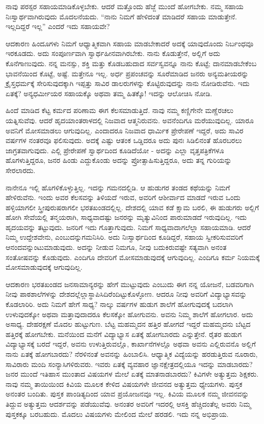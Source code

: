 ನಾವು ಪರಸ್ಪರ ಸಹಾಯಮಾಡಿಕೊಳ್ಳಬೇಕು. ಆದರೆ ಮತ್ತೊಂದು ಹೆಜ್ಜೆ ಮುಂದೆ ಹೋಗಬೇಕು. ನಮ್ಮ ಸಹಾಯ ನಿಃಸ್ವಾರ್ಥವಾಗಿರುವುದು ಮೊದಲನೆಯದು. “ನಾನು ನಿಮಗೆ ಹೇಳಿದಂತೆ ಮಾಡಿದರೆ ಸಹಾಯ ಮಾಡುತ್ತೇನೆ. ಇಲ್ಲದಿದ್ದರೆ ಇಲ್ಲ” ಎಂದರೆ ಇದು ಸಹಾಯವೇ?

ಆದಕಾರಣ ಹಿಂದೂಗಳು ನಿಮಗೆ ಆಧ್ಯಾತ್ಮಿಕವಾಗಿ ಸಹಾಯ ಮಾಡಬೇಕಾದರೆ ಅದಕ್ಕೆ ಯಾವುದೊಂದು ನಿರ್ಬಂಧವೂ ಇರಕೂಡದು. ಅದು ಸಂಪೂರ್ಣವಾಗಿ ಸ್ವಾರ್ಥಹೀನವಾಗಿರಬೇಕು. ನಾನು ಕೊಡುತ್ತೇನೆ, ಅಲ್ಲಿಗೆ ಅದು ಕೊನೆಗಾಣುವುದು. ನನ್ನ ಮನಸ್ಸು, ಶಕ್ತಿ ಮತ್ತು ಕೊಡಬಹುದಾದ ಸರ್ವಸ್ವವನ್ನೂ ನಾನು ಕೊಟ್ಟೆ; ದಾನಮಾಡಬೇಕೆಂಬ ಭಾವನೆಯಿಂದ ಕೊಟ್ಟೆ, ಅಷ್ಟೆ. ಮತ್ತೇನೂ ಇಲ್ಲ. ಅರ್ಧ ಪ್ರಪಂಚವನ್ನು ಸೂರೆಮಾಡಿದ ಜನರು ಅನ್ಯಮತೀಯರನ್ನು ಕ್ರೈಸ್ತಧರ್ಮಕ್ಕೆ ಸೇರಿಸುವುದಕ್ಕಾಗಿ ಇಪ್ಪತ್ತು ಸಾವಿರ ಡಾಲರುಗಳನ್ನು ಕೊಟ್ಟಿರುವುದನ್ನು ನಾನು ನೋಡಿರುವೆನು. ಇದು ಏತಕ್ಕೆ? ಅನ್ಯಧರ್ಮೀಯರ ಸಹಾಯಕ್ಕೊ ಅಥವಾ ತಮ್ಮ ಹಿತಕ್ಕೊ! ಇದನ್ನು ಆಲೋಚಿಸಿ ನೋಡಿ.

ಹಿಂದೆ ಮಾಡಿದ ಕೆಟ್ಟ ಕರ್ಮದ ಪರಿಣಾಮ ಈಗ ಕೆಲಸಮಾಡುತ್ತಿದೆ. ನಾವು ನಮ್ಮ ಕಣ್ಣಿಗೇನೇ ಮಣ್ಣೆರಚಲು ಯತ್ನಿಸುವೆವು. ಆದರೆ ಹೃದಯಾಂತರಾಳದಲ್ಲಿ ನಿಜವಾದ ಆತ್ಮನಿರುವನು. ಅವನೆಂದಿಗೂ ಮರೆಯುವುದಿಲ್ಲ. ಯಾರೂ ಅವನಿಗೆ ಮೋಸಮಾಡಲು ಆಗುವುದಿಲ್ಲ. ಎಂದಾದರೂ ನಿಜವಾದ ಧಾರ್ಮಿಕ ಪ್ರೇರೇಪಣೆ ಇದ್ದರೆ, ಅದು ಸಾವಿರ ವರ್ಷಗಳ ನಂತರವೂ ಫಲಿಸುವುದು. ಅದಕ್ಕೆ ಎಷ್ಟು ಆತಂಕ ಒಡ್ಡಿದರೂ ಅದು ಪುನಃ ಸಿಡಿಲಿನಂತೆ ಹೊರಬರಲು ಜಾಗ್ರತವಾಗುವುದು. ಎಲ್ಲಿ ಪ್ರೇರೇಪಣೆ ಸ್ವಾರ್ಥದಿಂದ ಕೂಡಿದೆಯೋ - ಅದನ್ನು ಎಲ್ಲಾ ವೃತ್ತಪತ್ರಿಕೆಗಳೂ ಹೊಗಳುತ್ತಿದ್ದರೂ, ಜನರ ಹಿಂಡು ಎದ್ದುಕೊಂಡು ಅದನ್ನು ಪ್ರೋತ್ಸಾಹಿಸುತ್ತಿದ್ದರೂ, ಅದು ತನ್ನ ಗುರಿಯನ್ನು ಸೇರಲಾರದು.

ನಾನೇನೂ ಇಲ್ಲಿ ಹೊಗಳಿಕೊಳ್ಳುತ್ತಿಲ್ಲ. ಇದನ್ನು ಗಮನದಲ್ಲಿಡಿ. ಆ ಹುಡುಗರ ತಂಡದ ಕಥೆಯನ್ನು ನಿಮಗೆ ಹೇಳಿರುವೆನು. ಇಂದು ಅವರ ಕೆಲಸವನ್ನು ತಿಳಿಯದೆ ಇರುವ, ಅವರಿಗೆ ಆಶೀರ್ವಾದ ಮಾಡದೆ ಇರುವ ಒಂದು ಹಳ್ಳಿಯಾಗಲೀ ಸ್ತ್ರೀಪುರುಷರಾಗಲೀ ಭರತಖಂಡದಲ್ಲಿಲ್ಲ. ದೇಶದಲ್ಲಿ ಯಾವ ಕಡೆ ಕ್ಷಾಮ ಬರಲಿ, ಈ ಹುಡುಗರು ಅಲ್ಲಿಗೆ ಹೋಗಿ ಸೇವೆಯಲ್ಲಿ ತನ್ಮಯರಾಗಿ, ಸಾಧ್ಯವಾದಷ್ಟು ಜನರನ್ನು ಮೃತ್ಯುವಿನಿಂದ ಪಾರುಮಾಡದೆ ಇರುವುದಿಲ್ಲ. ಇದು ಹೃದಯವನ್ನು ತಟ್ಟುವುದು. ಜನರಿಗೆ ಇದು ಗೊತ್ತಾಗುವುದು. ನಿಮಗೆ ಸಾಧ್ಯವಾದಾಗಲೆಲ್ಲಾ ಸಹಾಯಮಾಡಿ. ಆದರೆ ನಿಮ್ಮ ಉದ್ದೇಶವೇನು, ಎಂಬುದನ್ನು\break ಗಮನಿಸಿರಿ. ಅದು ನಿಃಸ್ವಾರ್ಥದಿಂದ ಕೂಡಿದ್ದರೆ, ಸಹಾಯ ಸ್ವೀಕರಿಸುವವರಿಗೆ ಆನಂದವನ್ನುಂಟುಮಾಡುವುದು. ಅದನ್ನು ನೀಡುವ ನಿಮಗೂ, ನೀವು ಬದುಕಿರುವಷ್ಟೇ ಸತ್ಯವಾಗಿ ಅನಂತ ಸಂತೋಷವನ್ನು ಕೊಡುವುದು. ಎಂದಿಗೂ ದೇವರಿಗೆ ಮೋಸಮಾಡುವುದಕ್ಕೆ ಆಗುವುದಿಲ್ಲ. ಎಂದಿಗೂ ಕರ್ಮ ನಿಯಮಕ್ಕೆ ಮೋಸಮಾಡುವುದಕ್ಕೆ ಆಗುವುದಿಲ್ಲ.

ಆದಕಾರಣ ಭರತಖಂಡದ ಜನಸಾಮಾನ್ಯರನ್ನು ಹೇಗೆ ಮುಟ್ಟುವುದು ಎಂಬುದು ಈಗ ನನ್ನ ಯೋಜನೆ, ಬಡವರಿಗಾಗಿ ನೀವು ಪಾಠಶಾಲೆಗಳನ್ನು ದೇಶದಲ್ಲೆಲ್ಲಾ\break ಸ್ಥಾಪಿಸಿದಿರೆಂದಿಟ್ಟುಕೊಳ್ಳೋಣ. ಆದರೂ ನೀವು ಅವರಿಗೆ ವಿದ್ಯಾಭ್ಯಾಸವನ್ನು ಕೊಡಲಾರಿರಿ. ಅದು ನಿಮಗೆ ಹೇಗೆ ಸಾಧ್ಯ? ನಾಲ್ಕು ವರ್ಷಗಳ ಹುಡುಗ ಶಾಲೆಗೆ ಹೋಗುವುದಕ್ಕೆ ಬದಲಾಗಿ ಉಳುವುದಕ್ಕೋ ಅಥವಾ ಮತ್ತಾವುದಾದರೂ ಕೆಲಸಕ್ಕೋ ಹೋಗುವನು. ಅವನು ನಿಮ್ಮ ಶಾಲೆಗೆ ಹೋಗಲಾರ. ಅದು ಅಸಾಧ್ಯ. ದೇಹರಕ್ಷಣೆ ಮೊದಲ ಹುಟ್ಟುಗುಣ. ಬೆಟ್ಟ ಮಹಮ್ಮದನ ಹತ್ತಿರ ಹೋಗದೆ ಇದ್ದರೆ ಮಹಮ್ಮದನು ಬೆಟ್ಟದ ಹತ್ತಿರಕ್ಕೆ ಹೋಗಬೇಕು. ಮನೆಯಿಂದ ಮನೆಗೆ ವಿದ್ಯಾಭ್ಯಾಸ ಏತಕ್ಕೆ ಹೋಗಬಾರದು ಎನ್ನುತ್ತೇನೆ. ರೈತರ ಹುಡುಗ ವಿದ್ಯಾಭ್ಯಾಸಕ್ಕೆ ಬರದೆ ಇದ್ದರೆ, ಅವನು ಉಳುತ್ತಿರುವಲ್ಲೊ, ಕಾರ್ಖಾನೆಗಳಲ್ಲೊ ಅಥವಾ ಅವನು ಎಲ್ಲಿರುವನೊ ಅಲ್ಲಿಗೆ ನಾನು ಏತಕ್ಕೆ ಹೋಗಬಾರದು? ನೆರಳಿನಂತೆ ಅವನನ್ನು ಹಿಂಬಾಲಿಸಿ. ಆಧ್ಯಾತ್ಮಿಕ ವಿದ್ಯೆಯನ್ನು ಹರಡುತ್ತಿರುವ ನೂರಾರು, ಸಾವಿರಾರು ಮಂದಿ ಸಂನ್ಯಾಸಿಗಳಿರುವರು. ಇವರು ಏತಕ್ಕೆ ವ್ಯವಹಾರ ಜ್ಞಾನಕ್ಷೇತ್ರದಲ್ಲಿಯೂ ಇದನ್ನು ಮಾಡಬಾರದು? ಜನರ ಮುಂದೆ ಇತಿಹಾಸ ಮುಂತಾದ ವಿಷಯಗಳ ಮೇಲೆ ಏತಕ್ಕೆ ಮಾತನಾಡಬಾರದು? ಕಿವಿಗಳೇ ಅತ್ಯುತ್ತಮ ಶಿಕ್ಷಕರು. ನಾವು ನಮ್ಮ ತಾಯಿಯಿಂದ ಕಿವಿಯ ಮೂಲಕ ಕೇಳಿದ ವಿಷಯಗಳೇ ಜೀವನದ ಅತ್ಯುತ್ತಮ ಧ್ಯೇಯಗಳು. ಪುಸ್ತಕ ಅನಂತರ ಬಂದಿತು. ಪುಸ್ತಕ ಪಾಂಡಿತ್ಯದಿಂದ ಯಾವ ಪ್ರಯೋಜನವೂ ಇಲ್ಲ. ಕಿವಿಯ ಮೂಲಕ ನಮ್ಮ ಜೀವನವನ್ನು ತಿದ್ದುವ ಅತ್ಯುತ್ತಮ ಆದರ್ಶವನ್ನು ಪಡೆಯುವೆವು. ಅನಂತರ ಅವರಿಗೆ ಇದರಲ್ಲಿ ಆಸಕ್ತಿ ಹೆಚ್ಚಿದಂತೆಲ್ಲ ಅವರು ನಿಮ್ಮ ಪುಸ್ತಕಕ್ಕೂ ಬರಬಹುದು. ಮೊದಲು ವಿಷಯಗಳು ಮೇಲಿಂದ ಮೇಲೆ ಹರಡಲಿ. ಇದು ನನ್ನ ಅಭಿಪ್ರಾಯ.


